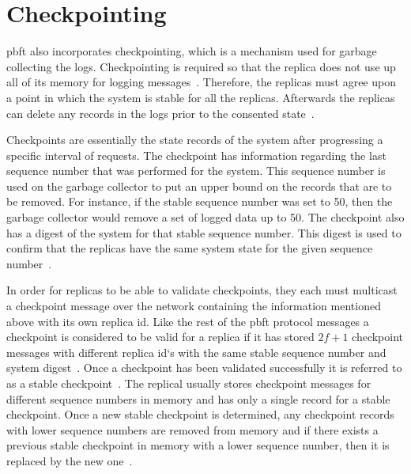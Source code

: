 \iffalse
\section{Checkpointing}
\label{sec:checkpoint}
\ac{pbft} also incorporates checkpointing, which is a mechanism used for garbage collecting the logs. Checkpointing is required so that the replica does not use up all of its memory for logging messages~\cite[p.~261]{BOOK:BuildDepDistSyst}. Therefore, the replicas must agree upon a point in which the system is stable for all the replicas. Afterwards the replicas can delete any records in the logs prior to the consented state~\cites[p.~5]{PAPER:OGPBFT}[p.~410]{PAPER:PBFTRecovery}.

Checkpoints are essentially the state records of the system after progressing a specific interval of requests. The checkpoint has information regarding the last sequence number that was performed for the system. This sequence number is used on the garbage collector to put an upper bound on the records that are to be removed. For instance, if the stable sequence number was set to 50, then the garbage collector would remove a set of logged data up to 50. The checkpoint also has a digest of the system for that stable sequence number. This digest is used to confirm that the replicas have the same system state for the given sequence number~\cites[p.~5]{PAPER:OGPBFT}[p.~410]{PAPER:PBFTRecovery}.

In order for replicas to be able to validate checkpoints, they each must multicast a checkpoint message over the network containing the information mentioned above with its own replica id. Like the rest of the \ac{pbft} protocol messages a checkpoint is considered to be valid for a replica if it has stored $2f+1$ checkpoint messages with different replica id`s with the same stable sequence number and system digest~\cites[p.~261-262]{BOOK:BuildDepDistSyst}[p.~5]{PAPER:OGPBFT}[p.~410]{PAPER:PBFTRecovery}. Once a checkpoint has been validated successfully it is referred to as a stable checkpoint~\cites[p.~3]{PAPER:DPBFT}[p.~261]{BOOK:BuildDepDistSyst}. The replical usually stores checkpoint messages for different sequence numbers in memory and has only a single record for a stable checkpoint. Once a new stable checkpoint is determined, any checkpoint records with lower sequence numbers are removed from memory and if there exists a previous stable checkpoint in memory with a lower sequence number, then it is replaced by  the new one~\cite[p.~261-262]{BOOK:BuildDepDistSyst}.

